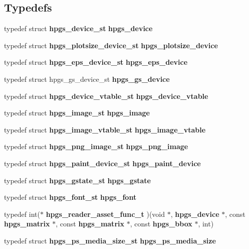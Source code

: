 \subsection*{Typedefs}
\begin{DoxyCompactItemize}
\item 
typedef struct {\bf hpgs\_\-device\_\-st} {\bfseries hpgs\_\-device}\label{group__device_ga100927b1ad4b437d61dddc42708fa8f3}

\item 
typedef struct {\bf hpgs\_\-plotsize\_\-device\_\-st} {\bfseries hpgs\_\-plotsize\_\-device}\label{group__device_ga98a37f93bf5799c2d55d6e59d9f2c1b1}

\item 
typedef struct {\bf hpgs\_\-eps\_\-device\_\-st} {\bfseries hpgs\_\-eps\_\-device}\label{group__device_ga648708ea6527d8ffec62f075471c78f9}

\item 
typedef struct hpgs\_\-gs\_\-device\_\-st {\bfseries hpgs\_\-gs\_\-device}\label{group__device_ga21b6ff6181ec0b14869ddf3aef4fc0e0}

\item 
typedef struct {\bf hpgs\_\-device\_\-vtable\_\-st} {\bfseries hpgs\_\-device\_\-vtable}\label{group__device_ga503100ff768d14078274b7abe457ac93}

\item 
typedef struct {\bf hpgs\_\-image\_\-st} {\bfseries hpgs\_\-image}\label{group__device_gae374b15dff89c5d2c569c4250d4e3a2b}

\item 
typedef struct {\bf hpgs\_\-image\_\-vtable\_\-st} {\bfseries hpgs\_\-image\_\-vtable}\label{group__device_ga3d673430a5742c7e44d5494bb124d221}

\item 
typedef struct {\bf hpgs\_\-png\_\-image\_\-st} {\bfseries hpgs\_\-png\_\-image}\label{group__device_ga73df7e42f65edb523ba4869a4c20155c}

\item 
typedef struct {\bf hpgs\_\-paint\_\-device\_\-st} {\bfseries hpgs\_\-paint\_\-device}\label{group__device_ga4ca0f0bd51075fb9da27bf731ab5eefd}

\item 
typedef struct {\bf hpgs\_\-gstate\_\-st} {\bfseries hpgs\_\-gstate}\label{group__device_ga2cbad771732e3c16b8efa41910affdf3}

\item 
typedef struct {\bf hpgs\_\-font\_\-st} {\bfseries hpgs\_\-font}\label{group__device_gad67dc54687613dc2af6ca86aa2a61cb3}

\item 
typedef int($\ast$ {\bfseries hpgs\_\-reader\_\-asset\_\-func\_\-t} )(void $\ast$, {\bf hpgs\_\-device} $\ast$, const {\bf hpgs\_\-matrix} $\ast$, const {\bf hpgs\_\-matrix} $\ast$, const {\bf hpgs\_\-bbox} $\ast$, int)\label{group__device_gab994453805be117de7c3e23d451b3348}

\item 
typedef struct {\bf hpgs\_\-ps\_\-media\_\-size\_\-st} {\bfseries hpgs\_\-ps\_\-media\_\-size}\label{group__device_ga9bbe4ba684b8a07c23d89ee820f00574}

\end{DoxyCompactItemize}
